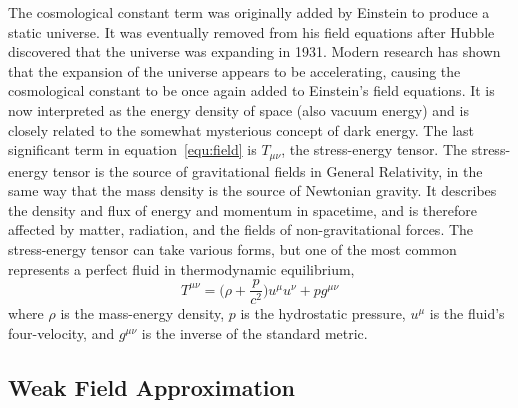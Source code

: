 The cosmological constant term was originally added by Einstein to produce a static universe. It was eventually removed from his field equations after Hubble discovered that the universe was expanding in 1931. Modern research has shown that the expansion of the universe appears to be accelerating, causing the cosmological constant to be once again added to Einstein's field equations. It is now interpreted as the energy density of space (also vacuum energy) and is closely related to the somewhat mysterious concept of dark energy. The last significant term in equation~\ref{equ:field} is $T_{\mu\nu}$, the stress-energy tensor. The stress-energy tensor is the source of gravitational fields in General Relativity, in the same way that the mass density is the source of Newtonian gravity. It describes the density and flux of energy and momentum in spacetime, and is therefore affected by matter, radiation, and the fields of non-gravitational forces. The stress-energy tensor can take various forms, but one of the most common represents a perfect fluid in thermodynamic equilibrium,
\begin{equation}
\label{equ:stress_energy_tensor}
    T^{\mu\nu} = \Big(\rho + \frac{p}{c^{2}}\Big)u^{\mu}u^{\nu} + pg^{\mu\nu}
\end{equation}
where $\rho$ is the mass-energy density, $p$ is the hydrostatic pressure, $u^{\mu}$ is the fluid's four-velocity, and $g^{\mu\nu}$ is the inverse of the standard metric.

\subsection{Weak Field Approximation}

